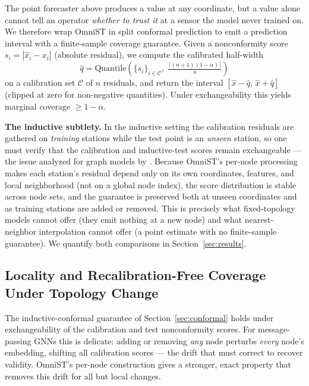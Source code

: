 \documentclass[journal]{IEEEtran}
\begin{document}
The point forecaster above produces a value at any coordinate, but a value alone cannot tell an operator \emph{whether to trust it} at a sensor the model never trained on. We therefore wrap OmniST in split conformal prediction \cite{vovk2005algorithmic,angelopoulos2023conformal} to emit a prediction interval with a finite-sample coverage guarantee. Given a nonconformity score $s_i = |\hat{x}_i - x_i|$ (absolute residual), we compute the calibrated half-width
\begin{equation}
\hat{q} = \mathrm{Quantile}\!\left(\{s_i\}_{i \in \mathcal{C}},\; \tfrac{\lceil (n+1)(1-\alpha)\rceil}{n}\right)
\end{equation}
on a calibration set $\mathcal{C}$ of $n$ residuals, and return the interval $[\hat{x} - \hat{q},\, \hat{x} + \hat{q}]$ (clipped at zero for non-negative quantities). Under exchangeability this yields marginal coverage $\ge 1-\alpha$.

\textbf{The inductive subtlety.} In the inductive setting the calibration residuals are gathered on \emph{training} stations while the test point is an \emph{unseen} station, so one must verify that the calibration and inductive-test scores remain exchangeable --- the issue analyzed for graph models by \cite{conformalinductivegnn2024}. Because OmniST's per-node processing makes each station's residual depend only on its own coordinates, features, and local neighborhood (not on a global node index), the score distribution is stable across node sets, and the guarantee is preserved both at unseen coordinates and as training stations are added or removed. This is precisely what fixed-topology models cannot offer (they emit nothing at a new node) and what nearest-neighbor interpolation cannot offer (a point estimate with no finite-sample guarantee). We quantify both comparisons in Section~\ref{sec:results}.

\subsection{Locality and Recalibration-Free Coverage Under Topology Change}
\label{sec:theory}

The inductive-conformal guarantee of Section~\ref{sec:conformal} holds under exchangeability of the
calibration and test nonconformity scores. For message-passing GNNs this is delicate: adding or
removing \emph{any} node perturbs \emph{every} node's embedding, shifting all calibration scores ---
the drift that \cite{conformalinductivegnn2024} must correct to recover validity. OmniST's per-node
construction gives a stronger, exact property that removes this drift for all but local changes.
\end{document}
